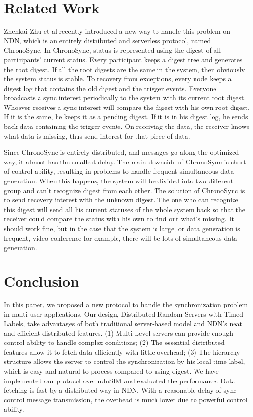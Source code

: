 \documentclass[conference]{IEEEtran}
\begin{document}
\section{Related Work}
\label{related_work}
Zhenkai Zhu et al recently introduced a new way to handle this problem on NDN,
which is an entirely distributed and serverless protocol, named ChronoSync.
In ChronoSync, status is represented using the digest of all participants' current status.
Every participant keeps a digest tree and generates the root digest.
If all the root digests are the same in the system, then obviously the system status is stable.
To recovery from exceptions, every node keeps a digest log that contains the old digest and the trigger events.
Everyone broadcasts a sync interest periodically to the system with its current root digest.
Whoever receives a sync interest will compare the digest with his own root digest.
If it is the same, he keeps it as a pending digest.
If it is in his digest log, he sends back data containing the trigger events.
On receiving the data, the receiver knows what data is missing, thus send interest for that piece of data.

Since ChronoSync is entirely distributed,
and messages go along the optimized way, it almost has the smallest delay.
The main downside of ChronoSync is short of control ability,
resulting in problems to handle frequent simultaneous data generation.
When this happens, the system will be divided into two different group and can't recognize digest from each other.
The solution of ChronoSync is to send recovery interest with the unknown digest.
The one who can recognize this digest will send all his current statuses of the whole system back
so that the receiver could compare the status with his own to find out what's missing.
It should work fine, but in the case that the system is large,
or data generation is frequent, video conference for example,
there will be lots of simultaneous data generation.

\section{Conclusion}
\label{conclusion}
In this paper, we proposed a new protocol to handle the synchronization problem in multi-user applications.
Our design, Distributed Random Servers with Timed Labels,
take advantages of both traditional server-based model and NDN's neat and efficient distributed features.
(1) Multi-Level servers can provide enough control ability to handle complex conditions;
(2) The essential distributed features allow it to fetch data efficiently with little overhead;
(3) The hierarchy structure allows the server to control the synchronization by his local time label,
which is easy and natural to process compared to using digest.
We have implemented our protocol over ndnSIM and evaluated the performance.
Data fetching is fast by a distributed way in NDN.
With a reasonable delay of sync control message transmission,
the overhead is much lower due to powerful control ability.
\end{document}
